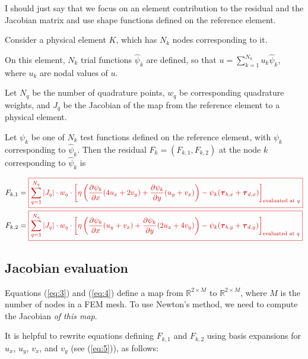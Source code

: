 \documentclass{amsart}
\newcommand{\diff}[2]{\ensuremath{\frac{\partial #1}{\partial #2}}}
\newcommand{\sumQ}{\ensuremath{\sum_{q = 1}^{N_q}}}
\newcommand{\basalshearstress}[1]{\boldsymbol{\tau}_{b#1}}
\newcommand{\taubx}{\basalshearstress{,x}}
\newcommand{\tauby}{\basalshearstress{,y}}
\newcommand{\drivingstress}[1]{\boldsymbol{\tau}_{d#1}}
\newcommand{\taudx}{\drivingstress{,x}}
\newcommand{\taudy}{\drivingstress{,y}}
\newcommand{\highlight}[1]{{\color{red!80!black} \fbox{$ \displaystyle #1 $} }}
\newcommand{\R}{\mathbb{R}}
\begin{document}
I should just say that we focus on an element contribution to the residual and the Jacobian matrix and use shape functions defined on the reference element.

Consider a physical element $K$, which has $N_k$ nodes corresponding to it.

On this element, $N_k$ trial functions $\hat \psi_k$ are defined, so that $u = \sum_{k = 1}^{N_k} u_k \hat \psi_k$, where $u_k$ are nodal values of $u$.

Let $N_q$ be the number of quadrature points, $w_q$ be corresponding quadrature weights, and $J_q$ be the Jacobian of the map from the reference element to a physical element.

Let $\psi_k$ be one of $N_k$ test functions defined on the reference element, with $\psi_k$ corresponding to $\hat \psi_k$. Then the residual $F_k = (F_{k,1}, F_{k,2})$ at the node $k$ corresponding to $\hat \psi_k$ is

\begin{align}
  \label{eq:3}
  F_{k,1} & = \highlight{ \sumQ |J_q| \cdot w_q\cdot \left[ \eta \left( \diff{\psi_k}{x} (4 u_x + 2 v_y) + \diff{\psi_k}{y} (u_y + v_x) \right) - \psi_k (\taubx + \taudx) \right]_{\text{evaluated at } q} }\\
  \label{eq:4}
  F_{k,2} & = \highlight{ \sumQ |J_q| \cdot w_q\cdot \left[ \eta \left( \diff{\psi_k}{x} (u_y + v_x) + \diff{\psi_k}{y} (2 u_x + 4 v_y) \right) - \psi_k (\tauby + \taudy) \right]_{\text{evaluated at } q} }
\end{align}


\subsection{Jacobian evaluation}
\label{sec-3-2}

Equations (\ref{eq:3}) and (\ref{eq:4}) define a map from $\R^{2\times M}$ to $\R^{2\times M}$, where $M$ is the number of nodes in a FEM mesh. To use Newton's method, we need to compute the Jacobian \emph{of this map}.

It is helpful to rewrite equations defining $F_{k,1}$ and $F_{k,2}$ using basis expansions for $u_x$, $u_y$, $v_x$, and $v_y$ (see (\ref{eq:5})), as follows:
\end{document}
